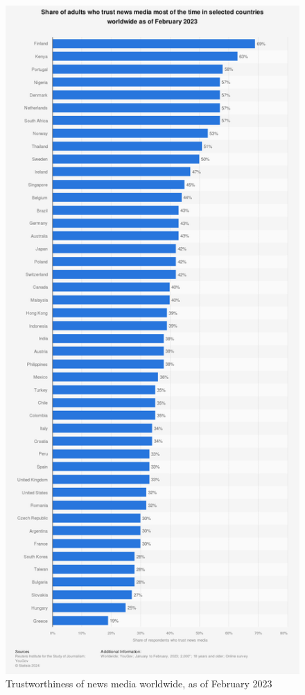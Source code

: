 \begin{figure}[htbp]
    \centering
    \includegraphics[width=0.6\linewidth]{images/statistic_id308468_trustworthiness-of-news-media-worldwide-2023.png}
    \caption{Trustworthiness of news media worldwide, as of February 2023 \cite{reuters-2023-trust}}
    \label{fig:trustworthiness-of-news-media-worldwide-2023}
\end{figure}

